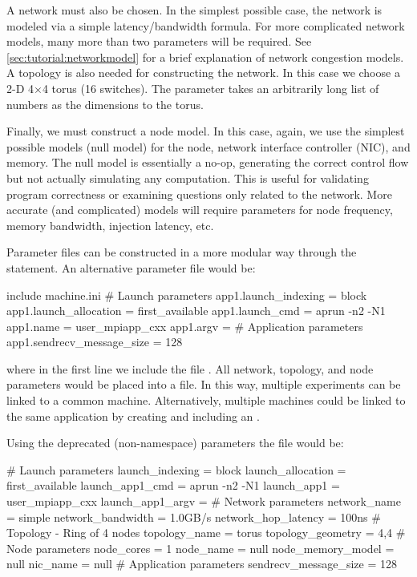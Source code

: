 A network must also be chosen.  
In the simplest possible case, the network is modeled via a simple latency/bandwidth formula.  
For more complicated network models, many more than two parameters will be required. 
See \ref{sec:tutorial:networkmodel} for a brief explanation of \sstmacro network congestion models. 
A topology is also needed for constructing the network.  
In this case we choose a 2-D 4$\times$4 torus (16 switches).  The  
parameter takes an arbitrarily long list of numbers as the dimensions to the torus.

Finally, we must construct a node model.  
In this case, again, we use the simplest possible models (null model) for the node, 
network interface controller (NIC), and memory.  
The null model is essentially a no-op, generating the correct control flow but not actually simulating any computation. 
This is useful for validating program correctness or examining questions only related to the network.  
More accurate (and complicated) models will require parameters for node frequency, memory bandwidth, injection latency, etc.

Parameter files can be constructed in a more modular way through the  statement.  
An alternative parameter file would be:

\begin{ViFile}
include machine.ini
# Launch parameters
app1.launch_indexing = block
app1.launch_allocation = first_available
app1.launch_cmd = aprun -n2 -N1
app1.name = user_mpiapp_cxx
app1.argv = 
# Application parameters
app1.sendrecv_message_size = 128
\end{ViFile}
where in the first line we include the file .  
All network, topology, and node parameters would be placed into a  file.  
In this way, multiple experiments can be linked to a common machine.  
Alternatively, multiple machines could be linked to the same application by creating and including an .

Using the deprecated (non-namespace) parameters the file would be:

\begin{ViFile}
# Launch parameters
launch_indexing = block
launch_allocation = first_available
launch_app1_cmd = aprun -n2 -N1
launch_app1 = user_mpiapp_cxx
launch_app1_argv = 
# Network parameters
network_name = simple
network_bandwidth = 1.0GB/s
network_hop_latency = 100ns
# Topology - Ring of 4 nodes
topology_name = torus
topology_geometry = 4,4
# Node parameters
node_cores = 1
node_name = null
node_memory_model = null
nic_name = null
# Application parameters
sendrecv_message_size = 128
\end{ViFile}

